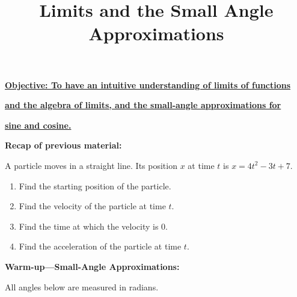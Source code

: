 \documentclass{article}
\begin{document}
\title{Limits and the Small Angle Approximations}
\date{}

\maketitle
\thispagestyle{empty}

\Large

\textbf{\underline{Objective: To have an intuitive understanding of limits of functions}}

\textbf{\underline{and the algebra of limits, and the small-angle approximations for}}

\textbf{\underline{sine and cosine.}}



\vspace{5mm}


\textbf{Recap of previous material:}

\vspace{5mm}

A particle moves in a straight line. Its position $x$ at time $t$ is $x=4t^2-3t+7$.
\begin{enumerate}
	\item Find the starting position of the particle.
	\item Find the velocity of the particle at time $t$.
	\item Find the time at which the velocity is 0.
	\item Find the acceleration of the particle at time $t$.
\end{enumerate}










\clearpage

{\bf Warm-up---Small-Angle Approximations:}

\vspace{5mm}


All angles below are measured in radians.
\end{document}
